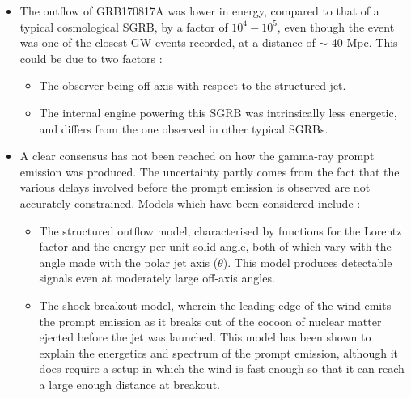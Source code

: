     \begin{itemize}

        \item The outflow of GRB170817A was lower in energy, compared to that of
            a typical cosmological SGRB, by a factor of $10^4 - 10^5$, even
            though the event was one of the closest GW events recorded, at a
            distance of $\sim$ 40 Mpc. This could be due to two factors :

            \begin{itemize}

                \item The observer being off-axis with respect to the structured
                    jet.

                \item The internal engine powering this SGRB was intrinsically
                    less energetic, and differs from the one observed in other
                    typical SGRBs.
            \end{itemize}

        \item A clear consensus has not been reached on how the gamma-ray prompt
            emission was produced. The uncertainty partly comes from the fact
            that the various delays involved before the prompt emission is
            observed are not accurately constrained. Models which have been
            considered include :

            \begin{itemize}

                \item The structured outflow model, characterised by functions
                    for the Lorentz factor and the energy per unit solid angle,
                    both of which vary with the angle made with the polar jet
                    axis ($\theta$). This model produces detectable signals even
                    at moderately large off-axis angles.

                \item The shock breakout model, wherein the leading edge of the
                    wind emits the prompt emission as it breaks out of the
                    cocoon of nuclear matter ejected before the jet was
                    launched. This model has been shown to explain the
                    energetics and spectrum of the prompt emission, although it
                    does require a setup in which the wind is fast enough so
                    that it can reach a large enough distance at breakout.

            \end{itemize}

    \end{itemize}

